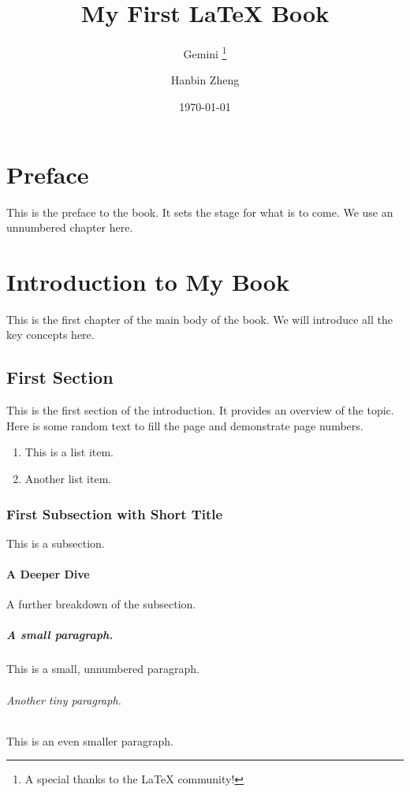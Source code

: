 \documentclass{book}
\title{My First \LaTeX{} Book}
\author{Gemini \thanks{A special thanks to the LaTeX community!}\and Hanbin Zheng}
\date{\today}
\begin{document}
\frontmatter
\maketitle %
\tableofcontents %

\chapter*{Preface} %
This is the preface to the book. It sets the stage for what is to come. We use an unnumbered chapter here.


\mainmatter

\chapter{Introduction to My Book}
This is the first chapter of the main body of the book. We will introduce all the key concepts here.

\section{First Section}
This is the first section of the introduction. It provides an overview of the topic.
Here is some random text to fill the page and demonstrate page numbers.
\begin{enumerate}
    \item This is a list item.
    \item Another list item.
\end{enumerate}

\subsection{First Subsection with Short Title}
This is a subsection.
\subsubsection{A Deeper Dive}
A further breakdown of the subsection.
\paragraph{A small paragraph.} This is a small, unnumbered paragraph.
\subparagraph{Another tiny paragraph.} This is an even smaller paragraph.
\end{document}
